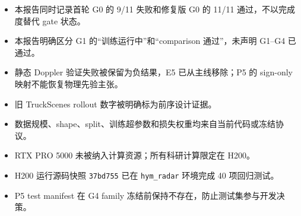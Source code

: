 \documentclass[11pt,a4paper,fontset=none]{ctexart}
\newcommand{\code}[1]{\texttt{#1}}
\begin{document}
\begin{itemize}
  \item 本报告同时记录首轮 G0 的 9/11 失败和修复版 G0 的 11/11 通过，不以完成度替代 gate 状态。
  \item 本报告明确区分 G1 的“训练运行中”和“comparison 通过”，未声明 G1--G4 已通过。
  \item 静态 Doppler 验证失败被保留为负结果，E5 已从主线移除；P5 的 sign-only 映射不能恢复物理先验主张。
  \item 旧 TruckScenes rollout 数字被明确标为前序设计证据。
  \item 数据规模、shape、split、训练超参数和损失权重均来自当前代码或冻结协议。
  \item RTX PRO 5000 未被纳入计算资源；所有科研计算限定在 H200。
  \item H200 运行源码快照 \code{37bd755} 已在 \code{hym\_radar} 环境完成 40 项回归测试。
  \item P5 test manifest 在 G4 family 冻结前保持不存在，防止测试集参与开发决策。
\end{itemize}
\end{document}
